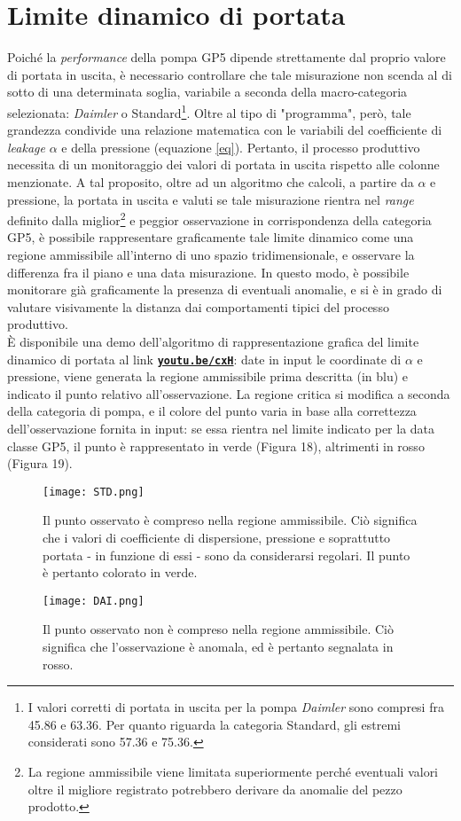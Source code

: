 \documentclass[fleqn,10pt]{SelfArx} %
\begin{document}
\section{Limite dinamico di portata}
Poiché la \textit{performance} della pompa GP5 dipende strettamente dal proprio valore di portata in uscita, è necessario controllare che tale misurazione non scenda al di sotto di una determinata soglia, variabile a seconda della macro-categoria selezionata: \textit{Daimler} o Standard\footnote{I valori corretti di portata in uscita per la pompa \textit{Daimler} sono compresi fra 45.86 e 63.36. Per quanto riguarda la categoria Standard, gli estremi considerati sono 57.36 e 75.36.}. Oltre al tipo di "programma", però, tale grandezza condivide una relazione matematica con le variabili del coefficiente di \textit{leakage} $\alpha$ e della pressione (equazione \ref{eq}). Pertanto, il processo produttivo necessita di un monitoraggio dei valori di portata in uscita rispetto alle colonne menzionate. A tal proposito, oltre ad un algoritmo che calcoli, a partire da $\alpha$ e pressione, la portata in uscita e valuti se tale misurazione rientra nel \textit{range} definito dalla miglior\footnote{La regione ammissibile viene limitata superiormente perché eventuali valori oltre il migliore registrato potrebbero derivare da anomalie del pezzo prodotto.} e peggior osservazione in corrispondenza della categoria GP5, è possibile rappresentare graficamente tale limite dinamico come una regione ammissibile all'interno di uno spazio tridimensionale, e osservare la differenza fra il piano e una data misurazione. In questo modo, è possibile monitorare già graficamente la presenza di eventuali anomalie, e si è in grado di valutare visivamente la distanza dai comportamenti tipici del processo produttivo.\\
È disponibile una demo dell'algoritmo di rappresentazione grafica del limite dinamico di portata al link \href{https://www.youtube.com/watch?v=cxHw8cPm-Ek}{\textbf{\texttt{youtu.be/cxH}}}: date in input le coordinate di $\alpha$ e pressione, viene generata la regione ammissibile prima descritta (in blu) e indicato il punto relativo all'osservazione. La regione critica si modifica a seconda della categoria di pompa, e il colore del punto varia in base alla correttezza dell'osservazione fornita in input: se essa rientra nel limite indicato per la data classe GP5, il punto è rappresentato in verde (Figura 18), altrimenti in rosso (Figura 19).
\begin{figure}[h]
    \centering
    \texttt{[image: STD.png]}
    \label{fig:em}
    \caption{Il punto osservato è compreso nella regione ammissibile. Ciò significa che i valori di coefficiente di dispersione, pressione e soprattutto portata - in funzione di essi - sono da considerarsi regolari. Il punto è pertanto colorato in verde.}
\end{figure}
\begin{figure}[h]
    \centering
    \texttt{[image: DAI.png]}
    \label{fig:em}
    \caption{Il punto osservato non è compreso nella regione ammissibile. Ciò significa che l'osservazione è anomala, ed è pertanto segnalata in rosso.}
\end{figure}
\end{document}
